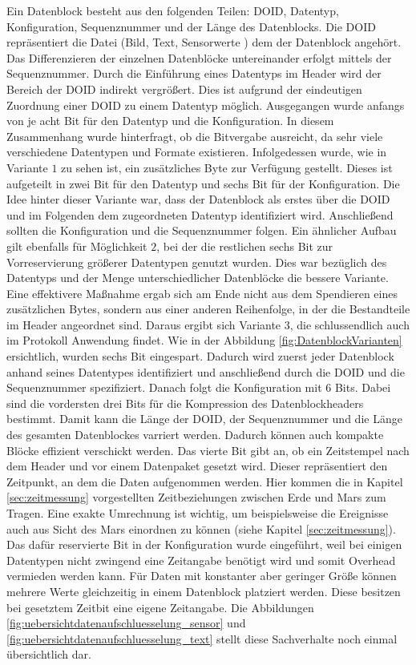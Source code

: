 Ein Datenblock besteht aus den folgenden Teilen: \gls{DOID}, Datentyp,
Konfiguration, Sequenznummer und der Länge des Datenblocks. Die \gls{DOID}
repräsentiert die Datei (Bild, Text, Sensorwerte \etc) dem der Datenblock
angehört. Das Differenzieren der einzelnen Datenblöcke untereinander erfolgt
mittels der Sequenznummer. Durch die Einführung eines Datentyps im Header wird
der Bereich der \gls{DOID} indirekt vergrößert. Dies ist aufgrund der
eindeutigen Zuordnung einer \gls{DOID} zu einem Datentyp möglich.
\newline
Ausgegangen wurde anfangs von je acht Bit für den Datentyp und
die Konfiguration.
In diesem Zusammenhang wurde hinterfragt, ob die Bitvergabe ausreicht,
da sehr viele verschiedene Datentypen und Formate existieren. Infolgedessen
wurde, wie in Variante $1$ zu sehen ist, ein zusätzliches Byte zur Verfügung
gestellt. Dieses ist aufgeteilt in zwei Bit für den Datentyp und sechs Bit für
der Konfiguration. Die Idee hinter dieser Variante war, dass der Datenblock als
erstes über die \gls{DOID} und im Folgenden dem zugeordneten Datentyp identifiziert
wird. Anschließend sollten die Konfiguration und die Sequenznummer folgen.
\newline
Ein ähnlicher Aufbau gilt ebenfalls für Möglichkeit $2$, bei der die restlichen
sechs Bit zur Vorreservierung größerer Datentypen genutzt wurden. Dies war
bezüglich des Datentyps und der Menge unterschiedlicher Datenblöcke die bessere
Variante. 
\newline
Eine effektivere Maßnahme ergab sich am Ende nicht aus dem Spendieren eines
zusätzlichen Bytes, sondern aus einer anderen Reihenfolge, in der die
Bestandteile im Header angeordnet sind. Daraus ergibt sich Variante $3$, die
schlussendlich auch im Protokoll Anwendung findet. Wie in der Abbildung
\ref{fig:DatenblockVarianten} ersichtlich, wurden sechs Bit eingespart. Dadurch
wird zuerst jeder Datenblock anhand seines Datentypes identifiziert und
anschließend durch die \gls{DOID} und die Sequenznummer spezifiziert. Danach
folgt die Konfiguration mit $6$ Bits. Dabei sind die vordersten drei Bits für
die Kompression des Datenblockheaders bestimmt. Damit kann die Länge der
\gls{DOID}, der Sequenznummer und die Länge des gesamten Datenblockes varriert
werden. Dadurch können auch kompakte Blöcke effizient verschickt werden.
Das vierte Bit gibt an, ob ein Zeitstempel nach dem Header und vor einem
Datenpaket gesetzt wird. Dieser repräsentiert den Zeitpunkt, an dem die Daten
aufgenommen werden. Hier kommen die in Kapitel \ref{sec:zeitmessung}
vorgestellten Zeitbeziehungen zwischen Erde und Mars zum Tragen. Eine
exakte Umrechnung ist wichtig, um beispielsweise die Ereignisse auch
aus Sicht des Mars einordnen zu können (siehe Kapitel \ref{sec:zeitmessung}).
Das dafür reservierte Bit in der Konfiguration wurde eingeführt, weil bei
einigen Datentypen nicht zwingend eine Zeitangabe benötigt wird und somit
Overhead vermieden werden kann. Für Daten mit konstanter aber geringer Größe
können mehrere Werte gleichzeitig in einem Datenblock platziert werden. Diese
besitzen bei gesetztem Zeitbit eine eigene Zeitangabe. Die Abbildungen
\ref{fig:uebersichtdatenaufschluesselung_sensor} und
\ref{fig:uebersichtdatenaufschluesselung_text} stellt diese Sachverhalte noch
einmal übersichtlich dar.


